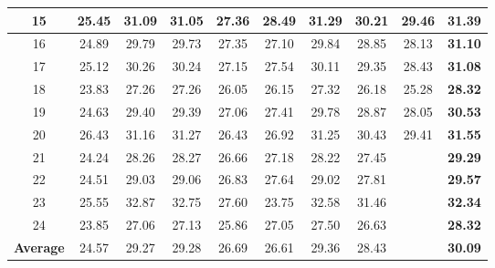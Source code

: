 \documentclass[10pt,onecolumn,letterpaper]{article}
\begin{document}
\begin{table}
\begin{center}
\begin{tabular}{|c||c|c|c|c|c|c|c|c|c|}
\hline
15 & 25.45 & 31.09 & 31.05 & 27.36 & 28.49 & 31.29 & 30.21 & 29.46 & \textbf{31.39}
\\
\hline
16 & 24.89 & 29.79 & 29.73 & 27.35 & 27.10 & 29.84 & 28.85 & 28.13 & \textbf{31.10}
\\
\hline
17 & 25.12 & 30.26 & 30.24 & 27.15 & 27.54 & 30.11 & 29.35 & 28.43 & \textbf{31.08}
\\
\hline
18 & 23.83 & 27.26 & 27.26 & 26.05 & 26.15 & 27.32 & 26.18 & 25.28 & \textbf{28.32}
\\
\hline
19 & 24.63 & 29.40 & 29.39 & 27.06 & 27.41 & 29.78 & 28.87 & 28.05 & \textbf{30.53}
\\
\hline
20 & 26.43 & 31.16 & 31.27 & 26.43 & 26.92 & 31.25 & 30.43 & 29.41 & \textbf{31.55}
\\
\hline
21 & 24.24 & 28.26 & 28.27 & 26.66 & 27.18 & 28.22 & 27.45 &  & \textbf{29.29}
\\
\hline
22 & 24.51 & 29.03 & 29.06 & 26.83 & 27.64 & 29.02 & 27.81 &  & \textbf{29.57}
\\
\hline
23 & 25.55 & 32.87 & 32.75 & 27.60 & 23.75 & 32.58 & 31.46 &  & \textbf{32.34}
\\
\hline
24 & 23.85 & 27.06 & 27.13 & 25.86 & 27.05 & 27.50 & 26.63 &  & \textbf{28.32}
\\
\hline
\textbf{Average} & 24.57 & 29.27 & 29.28 & 26.69 & 26.61 & 29.36 & 28.43 &  & \textbf{30.09}
\\
\hline
\end{tabular}
\end{center}
\vspace{-1mm}
\end{table}
\end{document}
